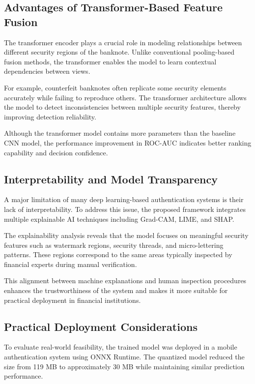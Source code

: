 \documentclass[preprint,12pt,authoryear]{elsarticle}
\begin{document}
\subsection{Advantages of Transformer-Based Feature Fusion}

The transformer encoder plays a crucial role in modeling relationships between different security regions of the banknote. Unlike conventional pooling-based fusion methods, the transformer enables the model to learn contextual dependencies between views.

For example, counterfeit banknotes often replicate some security elements accurately while failing to reproduce others. The transformer architecture allows the model to detect inconsistencies between multiple security features, thereby improving detection reliability.

Although the transformer model contains more parameters than the baseline CNN model, the performance improvement in ROC-AUC indicates better ranking capability and decision confidence.

\subsection{Interpretability and Model Transparency}

A major limitation of many deep learning-based authentication systems is their lack of interpretability. To address this issue, the proposed framework integrates multiple explainable AI techniques including Grad-CAM, LIME, and SHAP.

The explainability analysis reveals that the model focuses on meaningful security features such as watermark regions, security threads, and micro-lettering patterns. These regions correspond to the same areas typically inspected by financial experts during manual verification.

This alignment between machine explanations and human inspection procedures enhances the trustworthiness of the system and makes it more suitable for practical deployment in financial institutions.

\subsection{Practical Deployment Considerations}

To evaluate real-world feasibility, the trained model was deployed in a mobile authentication system using ONNX Runtime. The quantized model reduced the size from 119 MB to approximately 30 MB while maintaining similar prediction performance.
\end{document}
